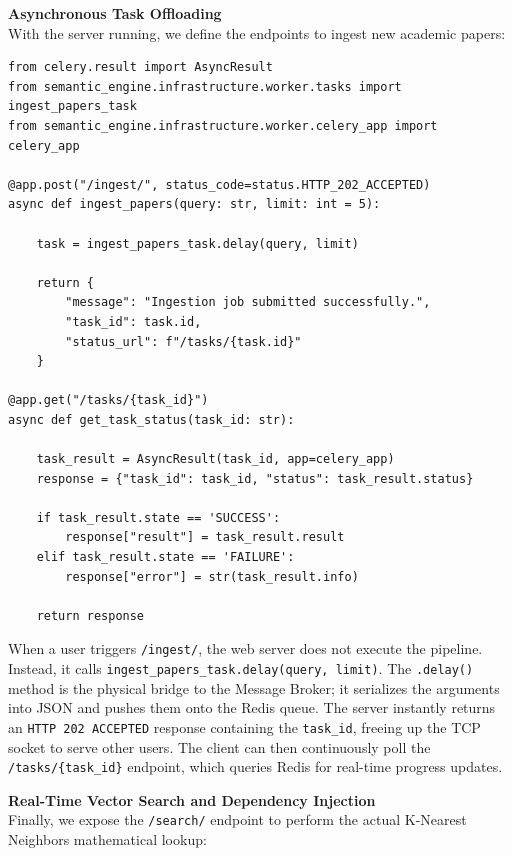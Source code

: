 \textbf{Asynchronous Task Offloading} \\
With the server running, we define the endpoints to ingest new academic papers:

\begin{lstlisting}[caption={Task Offloading and Status Polling}]
from celery.result import AsyncResult
from semantic_engine.infrastructure.worker.tasks import ingest_papers_task
from semantic_engine.infrastructure.worker.celery_app import celery_app

@app.post("/ingest/", status_code=status.HTTP_202_ACCEPTED)
async def ingest_papers(query: str, limit: int = 5):

    task = ingest_papers_task.delay(query, limit)

    return {
        "message": "Ingestion job submitted successfully.",
        "task_id": task.id,
        "status_url": f"/tasks/{task.id}"
    }

@app.get("/tasks/{task_id}")
async def get_task_status(task_id: str):

    task_result = AsyncResult(task_id, app=celery_app)
    response = {"task_id": task_id, "status": task_result.status}

    if task_result.state == 'SUCCESS':
        response["result"] = task_result.result
    elif task_result.state == 'FAILURE':
        response["error"] = str(task_result.info)

    return response
\end{lstlisting}

When a user triggers \texttt{/ingest/}, the web server does not execute the pipeline. Instead, it calls \texttt{ingest\_papers\_task.delay(query, limit)}. The \texttt{.delay()} method is the physical bridge to the Message Broker; it serializes the arguments into JSON and pushes them onto the Redis queue. The server instantly returns an \texttt{HTTP 202 ACCEPTED} response containing the \texttt{task\_id}, freeing up the TCP socket to serve other users. The client can then continuously poll the \texttt{/tasks/\{task\_id\}} endpoint, which queries Redis for real-time progress updates.

\textbf{Real-Time Vector Search and Dependency Injection} \\
Finally, we expose the \texttt{/search/} endpoint to perform the actual K-Nearest Neighbors mathematical lookup:

